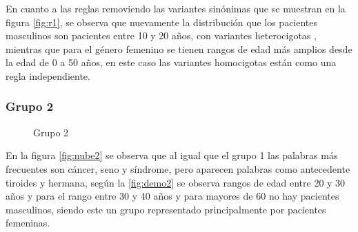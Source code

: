En cuanto a las reglas removiendo las variantes sinónimas que se muestran en la figura  \ref{fig:r1}, se observa que  nuevamente la distribución que los pacientes masculinos son pacientes entre 10 y 20 años, con variantes heterocigotas , mientras que para el género femenino se tienen rangos de edad más amplios desde la edad  de 0 a 50 años, en este caso las variantes homocigotas están como una regla independiente. \\

\subsubsection*{Grupo 2}

\begin{figure}[H]
	\centering
	\caption{Grupo 2} \label{fig:c2}
\end{figure}

En la figura \ref{fig:nube2} se observa que al igual que el grupo 1 las palabras más frecuentes son cáncer, seno y síndrome, pero aparecen palabras como antecedente tiroides y hermana, según la \ref{fig:demo2} se observa rangos de edad entre 20 y 30 años y para el rango entre 30 y 40 años y para mayores de 60 no hay pacientes masculinos, siendo este un grupo representado principalmente por pacientes femeninas.  

